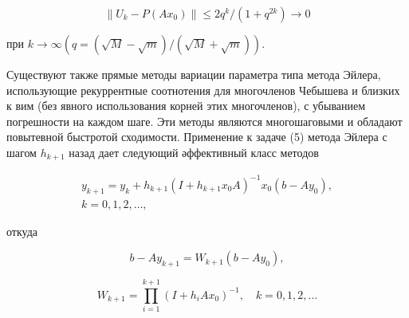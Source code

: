 \documentclass[10pt]{article}
\begin{document}
\[

\left\|U_{k}-P\left(A x_{0}\right)\right\| \leqslant 2 q^{k} /\left(1+q^{2 k}\right) \rightarrow 0

\]



при $k \longrightarrow \infty(q=(\sqrt{M}-\sqrt{m}) /(\sqrt{M}+\sqrt{m}))$.



Существуют также прямые методы вариации параметра типа метода Эйлера, использующие рекуррентные соотнотения для многочленов Чебышева и близких к вим (без явного использования корней этих многочленов), с убыванием погрешности на каждом шаге. Эти методы являются многошаговыми и обладают повытевной быстротой сходимости. Применение к задаче (5) метода Эйлера с шагом $h_{k+1}$ назад дает следующий әффективный класс методов



\[

\begin{gathered}

y_{k+1}=y_{k}+h_{k+1}\left(I+h_{k+1} x_{0} A\right)^{-1} x_{0}\left(b-A y_{0}\right), \\

k=0,1,2, \ldots,

\end{gathered}

\]



откуда



\[

b-A y_{k+1}=W_{k+1}\left(b-A y_{0}\right),

\]



\[

W_{k+1}=\prod_{i=1}^{k+1}\left(I+h_{i} A x_{0}\right)^{-1}, \quad k=0,1,2, \ldots

\]
\end{document}
